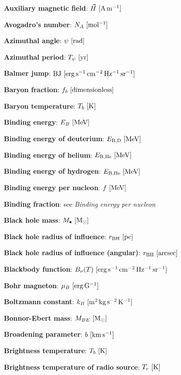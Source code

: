 \documentclass[a4paper,10pt]{article}
\begin{document}
{\noindent}\textbf{Auxiliary magnetic field}: $\vec{H} ~ [{\rm A\,m^{-1}}]$

{\noindent}\textbf{Avogadro's number}: $N_A ~ [{\rm mol^{-1}}]$

{\noindent}\textbf{Azimuthal angle}: $\psi ~ [{\rm rad}]$

{\noindent}\textbf{Azimuthal period}: $T_\psi ~ [{\rm yr}]$

{\noindent}\textbf{Balmer jump}: ${\rm BJ} ~ [{\rm erg\,s^{-1}\,cm^{-2}\,Hz^{-1}\,sr^{-1}}]$

{\noindent}\textbf{Baryon fraction}: $f_b ~ [{\rm dimensionless}]$

{\noindent}\textbf{Baryon temperature}: $T_b ~ [{\rm K}]$

{\noindent}\textbf{Binding energy}: $E_B ~ [{\rm MeV}]$

{\noindent}\textbf{Binding energy of deuterium}: $E_\mathrm{B,D} ~ [{\rm MeV}]$

{\noindent}\textbf{Binding energy of helium}: $E_\mathrm{B,He} ~ [{\rm MeV}]$

{\noindent}\textbf{Binding energy of hydrogen}: $E_\mathrm{B,He} ~ [{\rm MeV}]$

{\noindent}\textbf{Binding energy per nucleon}: $f ~ [{\rm MeV}]$

{\noindent}\textbf{Binding fraction}: see \textit{Binding energy per nucleon}

{\noindent}\textbf{Black hole mass}: $M_\bullet ~ [{\rm M_\odot}]$

{\noindent}\textbf{Black hole radius of influence}: $r_\mathrm{BH} ~ [{\rm pc}]$

{\noindent}\textbf{Black hole radius of influence (angular)}: $r_\mathrm{BH} ~ [{\rm arcsec}]$

{\noindent}\textbf{Blackbody function}: $B_\nu(T) ~ [{\rm erg\,s^{-1}\,cm^{-2}\,Hz^{-1}\,sr^{-1}}]$

{\noindent}\textbf{Bohr magneton}: $\mu_B ~ [{\rm erg\,G^{-1}}]$

{\noindent}\textbf{Boltzmann constant}: $k_B ~ [{\rm m^2\,kg\,s^{-2}\,K^{-1}}]$

{\noindent}\textbf{Bonnor-Ebert mass}: $M_{BE} ~ [{\rm M_\odot}]$

{\noindent}\textbf{Broadening parameter}: $b ~ [{\rm km\,s^{-1}}]$

{\noindent}\textbf{Brightness temperature}: $T_b ~ [{\rm K}]$

{\noindent}\textbf{Brightness temperature of radio source}: $T_r ~ [{\rm K}]$
\end{document}
